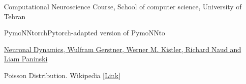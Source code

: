 \begin{thebibliography}{1}
        \begin{latin}
            Computational Neuroscience Course, School of computer science, University of Tehran
        \end{latin}
        \begin{latin}
            PymoNNtorchPytorch-adapted version of PymoNNto
        \end{latin}
        \begin{latin}
            \href{https://neuronaldynamics.epfl.ch/online/Ch12.S3.html}{Neuronal Dynamics, Wulfram Gerstner, Werner M. Kistler, Richard Naud and Liam Paninski
            }
        \end{latin}
        \begin{latin}
            Poisson Distribution. Wikipedia
            [\href{https://en.wikipedia.org/wiki/Poisson_distribution}{Link}]
        \end{latin}
    \end{thebibliography}